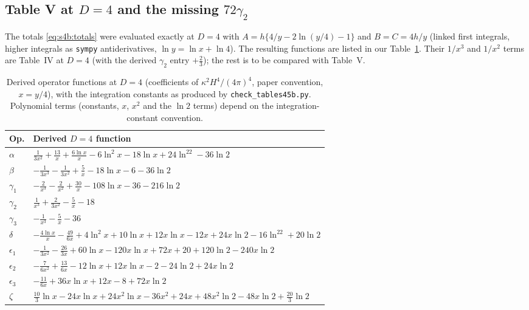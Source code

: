 \documentclass[aps,prd,onecolumn,10pt,nofootinbib,floatfix]{revtex4-2}
\begin{document}
\subsection{Table V at \texorpdfstring{$D=4$}{D=4} and the missing \texorpdfstring{$72\gamma_2$}{72 gamma2}}
\label{sec:s4b:tableV}

The totals \eqref{eq:s4b:totals} were evaluated exactly at $D=4$ with $A=h\{4/y-2\ln(y/4)-1\}$ and $B=C=4h/y$ (linked
first integrals, higher integrals as \texttt{sympy} antiderivatives, $\ln y=\ln x+\ln4$). The resulting functions are listed in
our Table~\ref{tab:s4b:D4totals}. Their $1/x^3$ and $1/x^2$ terms are Table~IV at $D=4$ (with the derived $\gamma_2$ entry
$+\frac23$); the rest is to be compared with Table~V.

\begin{table}[tb]
\caption{Derived operator functions at $D=4$ (coefficients of $\kappa^2H^4/(4\pi)^4$, paper convention, $x=y/4$), with
the integration constants as produced by \texttt{check\_tables45b.py}. Polynomial terms (constants, $x$, $x^2$ and the
$\ln2$ terms) depend on the integration-constant convention.}
\label{tab:s4b:D4totals}
\renewcommand{\arraystretch}{1.35}
\begin{ruledtabular}
\begin{tabular}{@{}ll@{}}
Op. & Derived $D=4$ function\\
\hline
$\alpha$ & $\frac{1}{3x^2}+\frac{13}{x}+\frac{6\ln x}{x}-6\ln^2x-18\ln x+24\ln^22-36\ln2$\\
$\beta$ & $-\frac{1}{3x^3}-\frac{1}{3x^2}+\frac5x-18\ln x-6-36\ln2$\\
$\gamma_1$ & $-\frac{2}{x^3}-\frac{2}{x^2}+\frac{30}{x}-108\ln x-36-216\ln2$\\
$\gamma_2$ & $\frac{1}{x^3}+\frac{2}{3x^2}-\frac5x-18$\\
$\gamma_3$ & $-\frac{1}{x^3}-\frac5x-36$\\
$\delta$ & $-\frac{4\ln x}{x}-\frac{49}{6x}+4\ln^2x+10\ln x+12x\ln x-12x+24x\ln2-16\ln^22+20\ln2$\\
$\epsilon_1$ & $-\frac{1}{3x^2}-\frac{26}{3x}+60\ln x-120x\ln x+72x+20+120\ln2-240x\ln2$\\
$\epsilon_2$ & $-\frac{7}{6x^2}+\frac{13}{6x}-12\ln x+12x\ln x-2-24\ln2+24x\ln2$\\
$\epsilon_3$ & $-\frac{11}{6x}+36x\ln x+12x-8+72x\ln2$\\
$\zeta$ & $\frac{10}{3}\ln x-24x\ln x+24x^2\ln x-36x^2+24x+48x^2\ln2-48x\ln2+\frac{20}{3}\ln2$\\
\end{tabular}
\end{ruledtabular}
\end{table}
\end{document}
